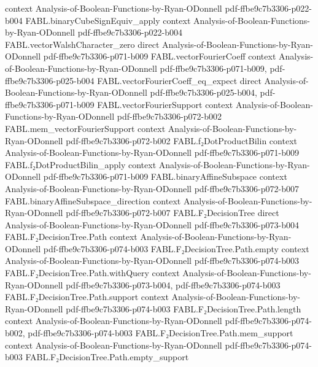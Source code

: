 \begin{theorem}
  {context}
  {Analysis-of-Boolean-Functions-by-Ryan-ODonnell}
  {pdf-ffbe9c7b3306-p022-b004}
\proofstep
  {FABL.binaryCubeSignEquiv_apply}
  {context}
  {Analysis-of-Boolean-Functions-by-Ryan-ODonnell}
  {pdf-ffbe9c7b3306-p022-b004}
\proofstep
  {FABL.vectorWalshCharacter_zero}
  {direct}
  {Analysis-of-Boolean-Functions-by-Ryan-ODonnell}
  {pdf-ffbe9c7b3306-p071-b009}
\proofstep
  {FABL.vectorFourierCoeff}
  {context}
  {Analysis-of-Boolean-Functions-by-Ryan-ODonnell}
  {pdf-ffbe9c7b3306-p071-b009,
    pdf-ffbe9c7b3306-p025-b004}
\proofstep
  {FABL.vectorFourierCoeff_eq_expect}
  {direct}
  {Analysis-of-Boolean-Functions-by-Ryan-ODonnell}
  {pdf-ffbe9c7b3306-p025-b004,
    pdf-ffbe9c7b3306-p071-b009}
\proofstep
  {FABL.vectorFourierSupport}
  {context}
  {Analysis-of-Boolean-Functions-by-Ryan-ODonnell}
  {pdf-ffbe9c7b3306-p072-b002}
\proofstep
  {FABL.mem_vectorFourierSupport}
  {context}
  {Analysis-of-Boolean-Functions-by-Ryan-ODonnell}
  {pdf-ffbe9c7b3306-p072-b002}
\proofstep
  {FABL.f₂DotProductBilin}
  {context}
  {Analysis-of-Boolean-Functions-by-Ryan-ODonnell}
  {pdf-ffbe9c7b3306-p071-b009}
\proofstep
  {FABL.f₂DotProductBilin_apply}
  {context}
  {Analysis-of-Boolean-Functions-by-Ryan-ODonnell}
  {pdf-ffbe9c7b3306-p071-b009}
\proofstep
  {FABL.binaryAffineSubspace}
  {context}
  {Analysis-of-Boolean-Functions-by-Ryan-ODonnell}
  {pdf-ffbe9c7b3306-p072-b007}
\proofstep
  {FABL.binaryAffineSubspace_direction}
  {context}
  {Analysis-of-Boolean-Functions-by-Ryan-ODonnell}
  {pdf-ffbe9c7b3306-p072-b007}
\proofstep
  {FABL.F₂DecisionTree}
  {direct}
  {Analysis-of-Boolean-Functions-by-Ryan-ODonnell}
  {pdf-ffbe9c7b3306-p073-b004}
\proofstep
  {FABL.F₂DecisionTree.Path}
  {context}
  {Analysis-of-Boolean-Functions-by-Ryan-ODonnell}
  {pdf-ffbe9c7b3306-p074-b003}
\proofstep
  {FABL.F₂DecisionTree.Path.empty}
  {context}
  {Analysis-of-Boolean-Functions-by-Ryan-ODonnell}
  {pdf-ffbe9c7b3306-p074-b003}
\proofstep
  {FABL.F₂DecisionTree.Path.withQuery}
  {context}
  {Analysis-of-Boolean-Functions-by-Ryan-ODonnell}
  {pdf-ffbe9c7b3306-p073-b004,
    pdf-ffbe9c7b3306-p074-b003}
\proofstep
  {FABL.F₂DecisionTree.Path.support}
  {context}
  {Analysis-of-Boolean-Functions-by-Ryan-ODonnell}
  {pdf-ffbe9c7b3306-p074-b003}
\proofstep
  {FABL.F₂DecisionTree.Path.length}
  {context}
  {Analysis-of-Boolean-Functions-by-Ryan-ODonnell}
  {pdf-ffbe9c7b3306-p074-b002,
    pdf-ffbe9c7b3306-p074-b003}
\proofstep
  {FABL.F₂DecisionTree.Path.mem_support}
  {context}
  {Analysis-of-Boolean-Functions-by-Ryan-ODonnell}
  {pdf-ffbe9c7b3306-p074-b003}
\proofstep
  {FABL.F₂DecisionTree.Path.empty_support}

\end{theorem}
